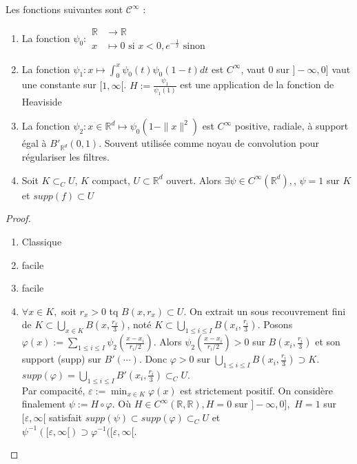 \begin{lemme}
\label{lemme4}

Les fonctions suivantes sont $\mathcal{C}^\infty$ :
\begin{enumerate}
        \item La fonction $\psi_0:
            \begin{aligned}
                \mathbb{R} &\to \mathbb{R} \\
                x&\mapsto 0 \text{ si } x<0, e^{-\frac{1}{x}} \text{ sinon}
            \end{aligned}$
        \item La fonction $\psi_1:x\mapsto \int_0^x\psi_0(t)\psi_0(1-t)dt$ est $C^\infty $, vaut 0 sur $]-\infty ,0]$  vaut une constante sur $[1,\infty [$. $H:=\frac{\psi_1}{\psi_1(1)} $  est une application de la fonction de Heaviside
        \item La fonction $\psi_2:x\in \mathbb{R} ^d\mapsto \psi_0(1-\|x\|^2)$ est $C^\infty $  positive, radiale, à support égal à $B'_{\mathbb{R} ^d}(0,1)$. Souvent utilisée comme noyau de convolution pour régulariser les filtres.
        \item Soit $K\subset_CU$, $K$ compact, $U\subset \mathbb{R} ^d$ ouvert. Alors $\exists \psi\in C^\infty (\mathbb{R} ^d),$, $\psi=1$ sur $K$et $supp(f)\subset U$
    \end{enumerate}
\end{lemme}
\begin{proof}\par\noindent
    \begin{enumerate}
        \item Classique
        \item facile
        \item facile
        \item $\forall x\in K, $  soit $r_x>0$ tq $B(x,r_x)\subset U$. On extrait un sous recouvrement fini de $K\subset \bigcup\limits_{x\in K} B(x,\frac{r_x}{3})$, noté $K\subset \bigcup\limits_{1\le i\le I} B(x_i, \frac{r_i}{3})$. Posons $\varphi (x):=\sum\limits_{1\le i\le I}^{} \psi_2(\frac{x-x_i}{r_i /2})$. Alors $\psi_2(\frac{x-x_i}{r_i /2})>0$ sur $B(x_i,\frac{r_i}{3})$ et son support (supp) sur $B'(\cdots)$. Donc $\varphi >0$  sur $\bigcup\limits_{1\le i\le I} B(x_i,\frac{r_i}{3})\supset K$. $supp(\varphi )=\bigcup\limits_{1\le i\le I} B'(x_i,\frac{r_i}{3})\subset _CU$.\\
            Par compacité, $\varepsilon :=\min_{x\in K}\varphi (x)$  est strictement positif. On considère finalement $\psi:=H\circ \varphi $. Où $H\in C^\infty (\mathbb{R} ,\mathbb{R} ), H=0$ sur $]-\infty ,0],$ $H=1$ sur $[\varepsilon ,\infty [$ satisfait $supp(\psi)\subset supp(\varphi )\subset _CU$ et \\
            $\psi^{-1}([\varepsilon ,\infty [)\supset \varphi ^{-1} ([\varepsilon ,\infty [$.
    \end{enumerate}
\end{proof}

